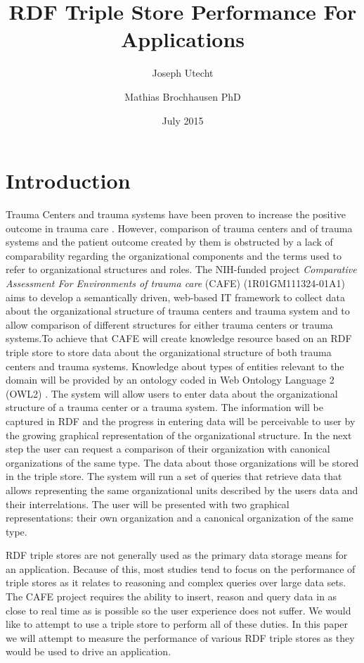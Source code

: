 \documentclass{llncs}
\title{RDF Triple Store Performance For Applications}
\author{Joseph Utecht \and Mathias Brochhausen PhD}
\institute{Department of Biomedical Informatics, University of Arkansas for Medical Sciences, Little Rock, AR}
\date{July 2015}
\begin{document}
\maketitle
\section{Introduction}

Trauma Centers and trauma systems have been proven to increase the positive outcome in trauma care \cite{pmid16427544, pmid21206286, pmid26151508}. However, comparison of trauma centers and of trauma systems and the patient outcome created by them is obstructed by a lack of comparability regarding the organizational components and the terms used to refer to organizational structures and roles. The NIH-funded project \textit{Comparative Assessment For Environments of trauma care} (CAFE) (1R01GM111324-01A1)  aims to develop a semantically driven, web-based IT framework to collect data about the organizational structure of trauma centers and trauma system and to allow comparison of different structures for either trauma centers or trauma systems.To achieve that CAFE will create knowledge resource based on an RDF triple store to store data about the organizational structure of both trauma centers and trauma systems. Knowledge about types of entities relevant to the domain will be provided by an ontology coded in Web Ontology Language 2 (OWL2) \cite{OWL2}. The system will allow users to enter data about the organizational structure of a trauma center or a trauma system. The information will be captured in RDF and the progress in entering data will be perceivable to user by the growing graphical representation of the organizational structure. In the next step the user can request a comparison of their organization with canonical organizations of the same type. The data about those organizations will be stored in the triple store. The system will run a set of queries that retrieve data that allows representing the same organizational units described by the users data and their interrelations. The user will be presented with two graphical representations: their own organization and a canonical organization of the same type.

RDF triple stores are not generally used as the primary data storage means for an application.  Because of this, most studies tend to focus on the performance of triple stores as it relates to reasoning and complex queries over large data sets.  The CAFE project requires the ability to insert, reason and query data in as close to real time as is possible so the user experience does not suffer.  We would like to attempt to use a triple store to perform all of these duties.  In this paper we will attempt to measure the performance of various RDF triple stores as they would be used to drive an application.
\end{document}
